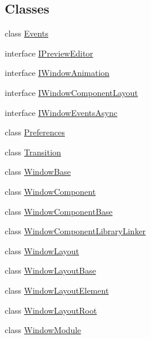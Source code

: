 \subsection*{Classes}
\begin{DoxyCompactItemize}
\item 
class \hyperlink{class_unity_engine_1_1_u_i_1_1_windows_1_1_events}{Events}
\item 
interface \hyperlink{interface_unity_engine_1_1_u_i_1_1_windows_1_1_i_preview_editor}{I\+Preview\+Editor}
\item 
interface \hyperlink{interface_unity_engine_1_1_u_i_1_1_windows_1_1_i_window_animation}{I\+Window\+Animation}
\item 
interface \hyperlink{interface_unity_engine_1_1_u_i_1_1_windows_1_1_i_window_component_layout}{I\+Window\+Component\+Layout}
\item 
interface \hyperlink{interface_unity_engine_1_1_u_i_1_1_windows_1_1_i_window_events_async}{I\+Window\+Events\+Async}
\item 
class \hyperlink{class_unity_engine_1_1_u_i_1_1_windows_1_1_preferences}{Preferences}
\item 
class \hyperlink{class_unity_engine_1_1_u_i_1_1_windows_1_1_transition}{Transition}
\item 
class \hyperlink{class_unity_engine_1_1_u_i_1_1_windows_1_1_window_base}{Window\+Base}
\item 
class \hyperlink{class_unity_engine_1_1_u_i_1_1_windows_1_1_window_component}{Window\+Component}
\item 
class \hyperlink{class_unity_engine_1_1_u_i_1_1_windows_1_1_window_component_base}{Window\+Component\+Base}
\item 
class \hyperlink{class_unity_engine_1_1_u_i_1_1_windows_1_1_window_component_library_linker}{Window\+Component\+Library\+Linker}
\item 
class \hyperlink{class_unity_engine_1_1_u_i_1_1_windows_1_1_window_layout}{Window\+Layout}
\item 
class \hyperlink{class_unity_engine_1_1_u_i_1_1_windows_1_1_window_layout_base}{Window\+Layout\+Base}
\item 
class \hyperlink{class_unity_engine_1_1_u_i_1_1_windows_1_1_window_layout_element}{Window\+Layout\+Element}
\item 
class \hyperlink{class_unity_engine_1_1_u_i_1_1_windows_1_1_window_layout_root}{Window\+Layout\+Root}
\item 
class \hyperlink{class_unity_engine_1_1_u_i_1_1_windows_1_1_window_module}{Window\+Module}

\end{DoxyCompactItemize}
